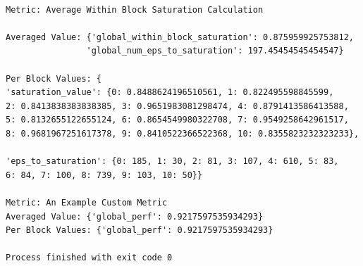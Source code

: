 \begin{verbatim}

Metric: Average Within Block Saturation Calculation

Averaged Value: {'global_within_block_saturation': 0.875959925753812, 
                'global_num_eps_to_saturation': 197.45454545454547}
                
Per Block Values: {
'saturation_value': {0: 0.8488624196510561, 1: 0.822495598845599, 
2: 0.8413838383838385, 3: 0.9651983081298474, 4: 0.8791413586413588, 
5: 0.8132655122655124, 6: 0.8654549980322708, 7: 0.9549258642961517, 
8: 0.9681967251617378, 9: 0.8410522366522368, 10: 0.8355823232323233},

'eps_to_saturation': {0: 185, 1: 30, 2: 81, 3: 107, 4: 610, 5: 83, 
6: 84, 7: 100, 8: 739, 9: 103, 10: 50}}

Metric: An Example Custom Metric
Averaged Value: {'global_perf': 0.9217597535934293}
Per Block Values: {'global_perf': 0.9217597535934293}

Process finished with exit code 0

\end{verbatim}
